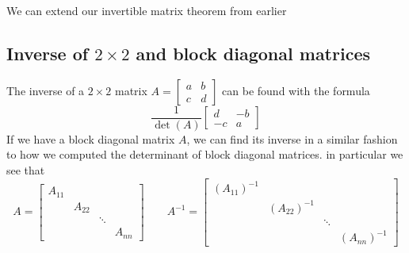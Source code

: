 \documentclass{report}
\begin{document}
We can extend our invertible matrix theorem from earlier
\subsection{Inverse of $2\times2$ and block diagonal matrices}
The inverse of a $2\times2$ matrix $A = \begin{bmatrix}a&b\\c&d\end{bmatrix}$ can be found with the formula
$$
\frac{1}{\det(A)}\begin{bmatrix}d&-b\\-c&a\end{bmatrix}
$$
If we have a block diagonal matrix $A$, we can find its inverse in a similar fashion to how we computed the determinant of block diagonal matrices. in particular we see that
$$
A = \begin{bmatrix}
A_{11}&&&\\
&A_{22}&&\\
&&\ddots&\\
&&&A_{nn}
\end{bmatrix}\qquad
A^{-1} = \begin{bmatrix}
(A_{11})^{-1}&&&\\
&(A_{22})^{-1}&&\\
&&\ddots&\\
&&&(A_{nn})^{-1}
\end{bmatrix}
$$
\newpage
\end{document}
